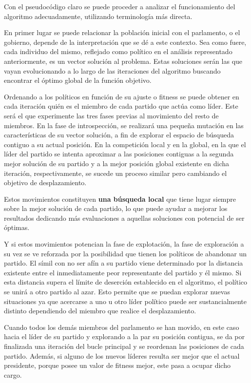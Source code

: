 Con el pseudocódigo claro se puede proceder a analizar el funcionamiento del algoritmo adecuadamente, utilizando terminología más directa.

En primer lugar se puede relacionar la población inicial con el parlamento, o el gobierno, depende de la interpretación que se dé a este contexto. Sea como fuere, cada individuo del mismo, reflejado como político en el análisis representado anteriormente, es un vector solución al problema. Estas soluciones serán las que vayan evolucionando a lo largo de las iteraciones del algoritmo buscando encontrar el óptimo global de la función objetivo.

Ordenando a los políticos en función de su ajuste o fitness se puede obtener en cada iteración quién es el miembro de cada partido que actúa como líder. Este será el que experimente las tres fases previas al movimiento del resto de miembros. En la fase de introspección, se realizará una pequeña mutación en las características de su vector solución, a fin de explorar el espacio de búsqueda contiguo a su actual posición. En la competición local y en la global, en la que el líder del partido se intenta aproximar a las posiciones contiguas a la segunda mejor solución de su partido y a la mejor posición global existente en dicha iteración, respectivamente, se sucede un proceso similar pero cambiando el objetivo de desplazamiento.

Estos movimientos constituyen \textbf{una búsqueda local} que tiene lugar siempre sobre la mejor solución de cada partido, lo que puede ayudar a mejorar los resultados dedicando más evaluaciones a aquellas soluciones con potencial de ser óptimas.

Y si estos movimientos potencian la fase de explotación, la fase de exploración a su vez se ve reforzada por la posibilidad que tienen los políticos de abandonar un partido. El símil con no ser afín a su partido viene determinado por la distancia existente entre el inmediatamente peor representante del partido y él mismo. Si esta distancia supera el límite de deserción establecido en el algoritmo, el político se unirá a otro partido al azar. Esto permite que se puedan explorar nuevas situaciones ya que acercarse a uno u otro líder político puede ser sustancialmente distinto dependiendo del miembro que realice el desplazamiento.

Cuando todos los demás miembros del parlamento se han movido, en este caso hacia el líder de su partido y explorando a la par su posición contigua, se da por finalizada una iteración del bucle principal y se reordenan las posiciones de cada partido. Además, si alguno de los nuevos líderes resulta ser mejor que el actual presidente, porque posee un valor de fitness mejor, este pasa a ocupar dicho cargo.

